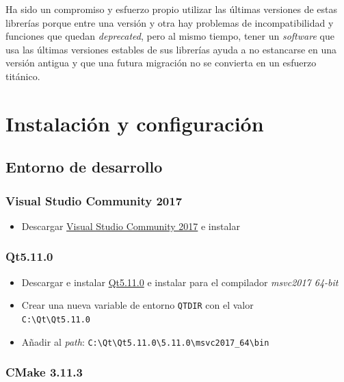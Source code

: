 Ha sido un compromiso y esfuerzo propio utilizar las últimas versiones de estas librerías porque entre una versión y otra hay problemas de incompatibilidad y funciones que quedan \textit{deprecated}, pero al mismo tiempo, tener un \textit{software} que usa las últimas versiones estables de sus librerías ayuda a no estancarse en una versión antigua y que una futura migración no se convierta en un esfuerzo titánico.

\section{Instalación y configuración}

\subsection{Entorno de desarrollo}

\subsubsection{Visual Studio Community 2017}

\begin{itemize}
	\item Descargar \href{https://www.visualstudio.com/es-es/downloads/download-visual-studio-vs.aspx}{Visual Studio Community 2017} e instalar
\end{itemize}

\subsubsection{Qt5.11.0}

\begin{itemize}
	\item Descargar e instalar \href{http://download.qt.io/official_releases/qt/5.11/5.11.0/qt-opensource-windows-x86-5.11.0.exe}{Qt5.11.0} e instalar para el compilador \textit{msvc2017 64-bit}
	\item Crear una nueva variable de entorno \texttt{QTDIR} con el valor \\ \texttt{C:\textbackslash Qt\textbackslash Qt5.11.0}
	\item Añadir al \textit{path}: \texttt{C:\textbackslash Qt\textbackslash Qt5.11.0\textbackslash 5.11.0\textbackslash msvc2017\_64\textbackslash bin}
\end{itemize}

\subsubsection{CMake 3.11.3}

